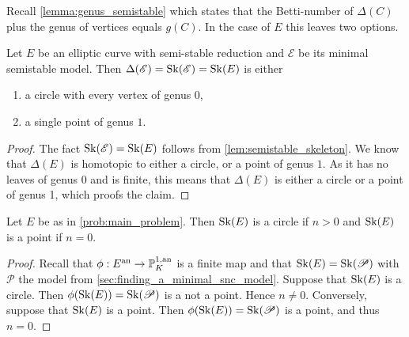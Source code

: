 Recall \cref{lemma:genus_semistable} which states that the Betti-number of $\Delta(C)$ plus the genus of vertices equals $g(C)$. 
In the case of $E$ this leaves two options. 
\begin{lemma}\label{lem:point_or_circle}
	Let $E$ be an elliptic curve with semi-stable reduction and $\mathscr E$ be its minimal semistable model. 
	Then $\Delta(\mathscr E) = \operatorname{Sk}(\mathscr E) = \operatorname{Sk}(E)$ is either 
	\begin{enumerate}
		\item a circle with every vertex of genus $0$,
		\item a single point of genus  $1$. 
	\end{enumerate}
\end{lemma}
\begin{proof}
	The fact $\operatorname{Sk}(\mathscr E) = \operatorname{Sk}(E)$ follows from \cref{lem:semistable_skeleton}. 
	We know that $\Delta(E)$ is homotopic to either a circle, or a point of genus $1$. 
	As it has no leaves of genus $0$ and is finite, this means that $\Delta(E)$ is either a circle or a point of genus 1, which proofs the claim.
\end{proof}

\begin{lemma}
	Let $E$ be as in \cref{prob:main_problem}. 
	Then $\operatorname{Sk}(E)$ is a circle if $n > 0$ and $\operatorname{Sk}(E)$ is a point if $n = 0$. 
\end{lemma}
\begin{proof}
	Recall that $\phi: E\an \to \pro^{1, \text{an}}_K$ is a finite map and that $\operatorname{Sk}(E) = \operatorname{Sk}(\mathscr P)$ with $\mathscr P$ the model from \cref{sec:finding_a_minimal_snc_model}.
	Suppose that $\operatorname{Sk}(E)$ is a circle. 
	Then $\phi(\sk(E))= \sk(\mathscr P)$ is a not a point. 
	Hence $n \ne 0$. 
	Conversely, suppose that $\operatorname{Sk}(E)$ is a point. 
	Then $\phi(\sk(E)) = \sk(\mathscr P)$ is a point, and thus $n  = 0$. 
\end{proof}


